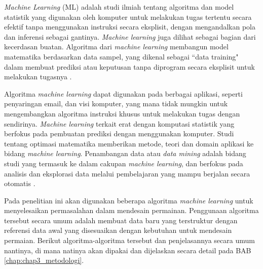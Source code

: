 \textit{Machine Learning} (ML) adalah studi ilmiah tentang algoritma dan model statistik yang digunakan oleh komputer untuk melakukan tugas tertentu secara efektif tanpa menggunakan instruksi secara eksplisit, dengan mengandalkan pola dan inferensi sebagai gantinya. \textit{Machine learning} juga dilihat sebagai bagian dari kecerdasan buatan. Algoritma dari \textit{machine learning} membangun model matematika berdasarkan data sampel, yang dikenal sebagai ``data training" dalam membuat prediksi atau keputusan tanpa diprogram secara eksplisit untuk melakukan tugasnya \citep{Koza1996}.
\vspace{1ex}

Algoritma \textit{machine learning} dapat digunakan pada berbagai aplikasi, seperti penyaringan email, dan visi komputer, yang mana tidak mungkin untuk mengembangkan algoritma instruksi khusus untuk melakukan tugas dengan sendirinya. \textit{Machine learning} terkait erat dengan komputasi statistik yang berfokus pada pembuatan prediksi dengan menggunakan komputer. Studi tentang optimasi matematika memberikan metode, teori dan domain aplikasi ke bidang \textit{machine learning}. Penambangan data atau \textit{data mining} adalah bidang studi yang termasuk ke dalam cakupan \textit{machine learning}, dan berfokus pada analisis dan eksplorasi data melalui pembelajaran yang mampu berjalan secara otomatis \citep{Friedman1997}.
\vspace{1ex}

Pada penelitian ini akan digunakan beberapa algoritma \textit{machine learning} untuk menyelesaikan permasalahan dalam mendesain permainan. Penggunaan algoritma tersebut secara umum adalah membuat data baru yang terstruktur dengan referensi data awal yang disesuaikan dengan kebutuhan untuk mendesain permaian. Berikut algoritma-algoritma tersebut dan penjelasannya secara umum nantinya, di mana natinya akan dipakai dan dijelaskan secara detail pada BAB \ref{chap:chap3_metodologi}.
\vspace{1ex}

